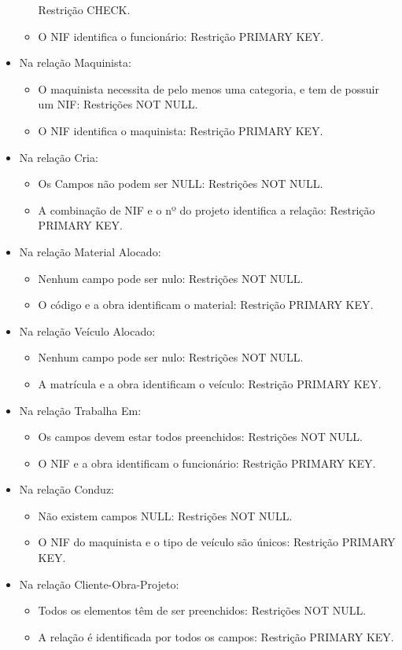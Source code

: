 \documentclass{report}
\begin{document}
\begin{itemize}
\begin{itemize}
				Restrição CHECK.
				\item O NIF identifica o funcionário: Restrição PRIMARY KEY.
			\end{itemize}
			\item Na relação Maquinista:
			\begin{itemize}
				\item O maquinista necessita de pelo menos uma categoria, e tem de possuir um 
				NIF: Restrições NOT NULL.
				\item O NIF identifica o maquinista: Restrição PRIMARY KEY.
			\end{itemize}
			\item Na relação Cria:
			\begin{itemize}
				\item Os Campos não podem ser NULL: Restrições NOT NULL.
				\item A combinação de NIF e o nº do projeto identifica a relação: Restrição
				PRIMARY KEY.
			\end{itemize}
			\item Na relação Material Alocado:
			\begin{itemize}
				\item Nenhum campo pode ser nulo: Restrições NOT NULL.
				\item O código e a obra identificam o material: Restrição PRIMARY KEY.
			\end{itemize}
			\item Na relação Veículo Alocado:
			\begin{itemize}
				\item Nenhum campo pode ser nulo: Restrições NOT NULL.
				\item A matrícula e a obra identificam o veículo: Restrição PRIMARY KEY.
			\end{itemize}
			\item Na relação Trabalha Em:
			\begin{itemize}
				\item Os campos devem estar todos preenchidos: Restrições NOT NULL.
				\item O NIF e a obra identificam o funcionário: Restrição PRIMARY KEY.
			\end{itemize}
			\item Na relação Conduz:
			\begin{itemize}
				\item Não existem campos NULL: Restrições NOT NULL.
				\item O NIF do maquinista e o tipo de veículo são únicos: Restrição PRIMARY 
				KEY.
			\end{itemize}
			\item Na relação Cliente-Obra-Projeto:
			\begin{itemize}
				\item Todos os elementos têm de ser preenchidos: Restrições NOT NULL.
				\item A relação é identificada por todos os campos: Restrição PRIMARY KEY.
			\end{itemize}
		\end{itemize}
		
\end{document}
